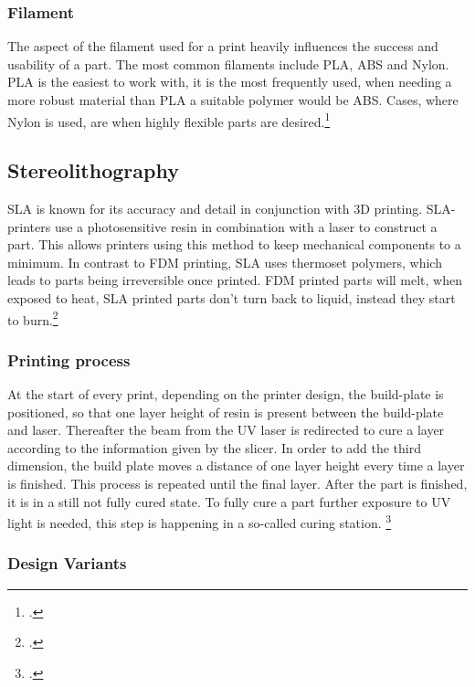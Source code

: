 \subsubsection{Filament}

The aspect of the filament used for a print heavily influences the success and usability of a part. The most common filaments include PLA, ABS and Nylon. PLA is the easiest to work with, it is the most frequently used, when needing a more robust material than PLA a suitable polymer would be ABS. Cases, where Nylon is used, are when highly flexible parts are desired.\footcite{hubsIntroToFDM3DPrintingNoDate}


\subsection{Stereolithography}

SLA is known for its accuracy and detail in conjunction with 3D printing. SLA-printers use a photosensitive resin in combination with a laser to construct a part. This allows printers using this method to keep mechanical components to a minimum. In contrast to FDM printing, SLA uses thermoset polymers, which leads to parts being irreversible once printed. FDM printed parts will melt, when exposed to heat, SLA printed parts don't turn back to liquid, instead they start to burn.\footcite{hubsSLA3DPrintingNoDate}

\subsubsection{Printing process}

At the start of every print, depending on the printer design, the build-plate is positioned, so that one layer height of resin is present between the build-plate and laser. Thereafter the beam from the UV laser is redirected to cure a layer according to the information given by the slicer. In order to add the third dimension, the build plate moves a distance of one layer height every time a layer is finished. This process is repeated until the final layer.\newline
After the part is finished, it is in a still not fully cured state. To fully cure a part further exposure to UV light is needed, this step is happening in a so-called curing station. \footcite{hubsSLA3DPrintingNoDate} 

\subsubsection{Design Variants}

